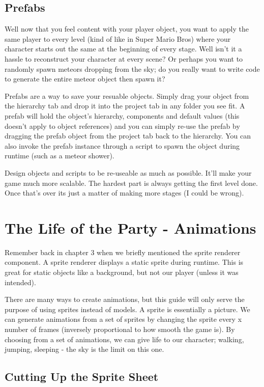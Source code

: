 \documentclass[12pt]{article}
\begin{document}
\subsection{Prefabs}

Well now that you feel content with your player object, you want to apply the same player to every level (kind of like in Super Mario Bros) where your character starts out the same at the beginning of every stage. Well isn't it a hassle to reconstruct your character at every scene? Or perhaps you want to randomly spawn meteors dropping from the sky; do you really want to write code to generate the entire meteor object then spawn it?

Prefabs are a way to save your resuable objects. Simply drag your object from the hierarchy tab and drop it into the project tab in any folder you see fit. A prefab will hold the object's hierarchy, components and default values (this doesn't apply to object references) and you can simply re-use the prefab by dragging the prefab object from the project tab back to the hierarchy. You can also invoke the prefab instance through a script to spawn the object during runtime (such as a meteor shower).

Design objects and scripts to be re-useable as much as possible. It'll make your game much more scalable. The hardest part is always getting the first level done. Once that's over its just a matter of making more stages (I could be wrong).    

\newpage

\section{The Life of the Party - Animations}

Remember back in chapter 3 when we briefly mentioned the sprite renderer component. A sprite renderer displays a static sprite during runtime. This is great for static objects like a background, but not our player (unless it was intended). 

There are many ways to create animations, but this guide will only serve the purpose of using sprites instead of models. A sprite is essentially a picture. We can generate animations from a set of sprites by changing the sprite every x number of frames (inversely proportional to how smooth the game is). By choosing from a set of animations, we can give life to our character; walking, jumping, sleeping - the sky is the limit on this one.

\subsection{Cutting Up the Sprite Sheet}
\end{document}
